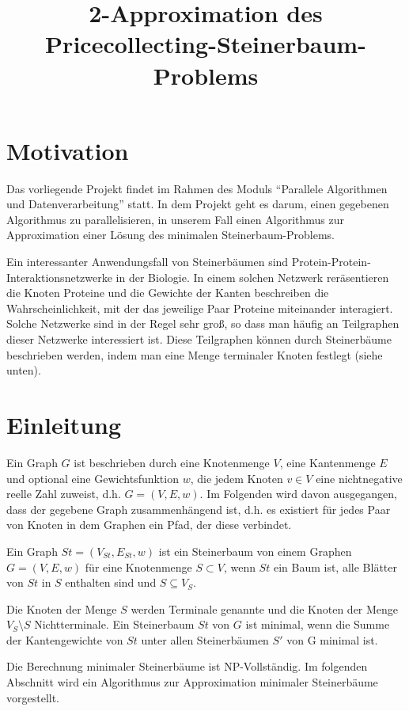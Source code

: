 \documentclass[a4paper,10pt]{article}
\title{2-Approximation des Pricecollecting-Steinerbaum-Problems}
\author{}
\begin{document}
\maketitle

\section{Motivation}
Das vorliegende Projekt findet im Rahmen des Moduls ``Parallele Algorithmen und Datenverarbeitung'' statt. In dem Projekt geht es darum, einen gegebenen
Algorithmus zu parallelisieren, in unserem Fall einen Algorithmus zur Approximation einer Lösung des minimalen Steinerbaum-Problems.

Ein interessanter Anwendungsfall von Steinerbäumen sind Protein-Protein-Interaktionsnetzwerke in der Biologie. In einem solchen Netzwerk
reräsentieren die Knoten Proteine und die Gewichte der Kanten beschreiben die Wahrscheinlichkeit, mit der das jeweilige Paar Proteine miteinander
interagiert. Solche Netzwerke sind in der Regel sehr groß, so dass man häufig an Teilgraphen dieser Netzwerke interessiert ist.
Diese Teilgraphen können durch Steinerbäume beschrieben werden, indem man eine Menge terminaler Knoten festlegt (siehe unten).


\section{Einleitung}
Ein Graph $G$ ist beschrieben durch eine Knotenmenge $V$, eine Kantenmenge $E$ und optional eine Gewichtsfunktion $w$, die jedem Knoten $v \in V$
eine nichtnegative reelle Zahl zuweist, d.h. $G = (V,E,w)$. Im Folgenden wird davon ausgegangen, dass der gegebene Graph zusammenhängend ist,
d.h. es existiert für jedes Paar von Knoten in dem Graphen ein Pfad, der diese verbindet.

Ein Graph $St = (V_{St}, E_{St}, w)$ ist ein Steinerbaum von einem Graphen $G = (V, E, w)$ für eine Knotenmenge $S \subset V$, wenn $St$ ein Baum ist, alle Blätter von $St$ in $S$ enthalten sind und $S \subseteq V_S$\cite{steinerProblem}. 

Die Knoten der Menge $S$ werden Terminale genannte und die Knoten der Menge
$V_S \setminus S$ Nichtterminale. Ein Steinerbaum $St$ von $G$ ist minimal, wenn die Summe der Kantengewichte von $St$ unter allen Steinerbäumen $S'$ von G minimal ist.
\smallskip

Die Berechnung minimaler Steinerbäume ist NP-Vollständig. Im folgenden Abschnitt wird ein Algorithmus zur Approximation minimaler Steinerbäume vorgestellt.
\end{document}
